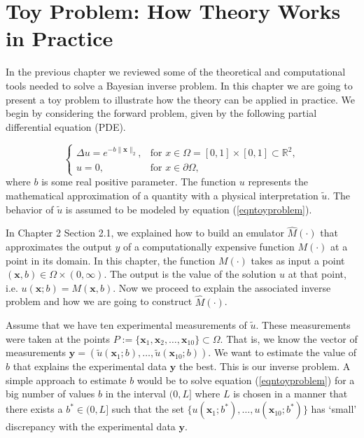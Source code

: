 \documentclass[12pt]{book}
\newcommand{\x}{\textbf{x}}
\newcommand{\y}{\textbf{y}}
\begin{document}
\chapter{Toy Problem: How Theory Works in Practice}

In the previous chapter we reviewed some  of the theoretical and computational tools needed to solve
a Bayesian inverse problem. In this chapter
we are going to present  a toy problem to illustrate how the theory  can be applied in practice.
We begin by considering the forward problem, given by the following partial differential equation (PDE).

\begin{equation}\label{eqntoyproblem}
\left\{
	\begin{array}{ll}
		\Delta u=e^{-b\|\x\|_{2}}, &\mbox{for } x\in\Omega=[0,1]\times [0,1]\subset\mathbb{R}^{2}, \\
		u=0, & \mbox{for } x\in\partial\Omega,
	\end{array}
\right.
\end{equation} 
where $b$ is some real positive parameter. The 
function $u$ represents the mathematical approximation of  a quantity with a physical interpretation  $\tilde{u}$. The  behavior
of $\tilde{u}$ is assumed to be    modeled by equation (\ref{eqntoyproblem}).

In Chapter 2 Section 2.1, we explained how to build an emulator $\hat{M}(\cdot)$  that approximates
the output $y$  of a computationally expensive function  $M(\cdot)$ at a point  in its domain. 
In  this chapter, the function $M(\cdot)$ takes as input a point  $(\textbf{x},b)\in\Omega\times(0,\infty)$. The
output is the value of the solution $u$ at that 
point, i.e. $u(\textbf{x};b)=M(\textbf{x},b)$. Now we proceed to explain the associated inverse problem and  how we are going to construct $\hat{M}(\cdot)$.  

Assume that we have ten experimental measurements 
of $\tilde{u}$. These measurements were taken  at the points $P:=\{\x_{1},\x_{2},\ldots,\x_{10}\}\subset\Omega$. 
That is, we know the vector of measurements 
$\textbf{y}=(\tilde{u}(\x_{1};b),\ldots,\tilde{u}(\x_{10};b))$.
We want to estimate the value of $b$ that explains  the experimental data $\textbf{y}$ the best. 
This is our inverse problem. 
A simple approach to estimate $b$ 
would be to solve equation (\ref{eqntoyproblem}) for a big number of values $b$ in the interval $(0,L]$ where $L$ 
is chosen in a manner that there exists a $b^{*}\in (0,L]$ such that the set 
$\{u(\x_{1};b^{*}),\ldots,u(\x_{10};b^{*})\}$
has `small' discrepancy with the experimental data $\y$.
 
\end{document}
